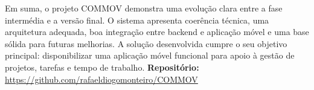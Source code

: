 \documentclass[12pt,a4paper]{article}
\begin{document}
Em suma, o projeto COMMOV demonstra uma evolução clara entre a fase intermédia e a versão final. O sistema apresenta coerência técnica, uma arquitetura adequada, boa integração entre backend e aplicação móvel e uma base sólida para futuras melhorias. A solução desenvolvida cumpre o seu objetivo principal: disponibilizar uma aplicação móvel funcional para apoio à gestão de projetos, tarefas e tempo de trabalho.
\vspace{0.5cm}
\noindent
\textbf{Repositório:} \url{https://github.com/rafaeldiogomonteiro/COMMOV}
\end{document}
